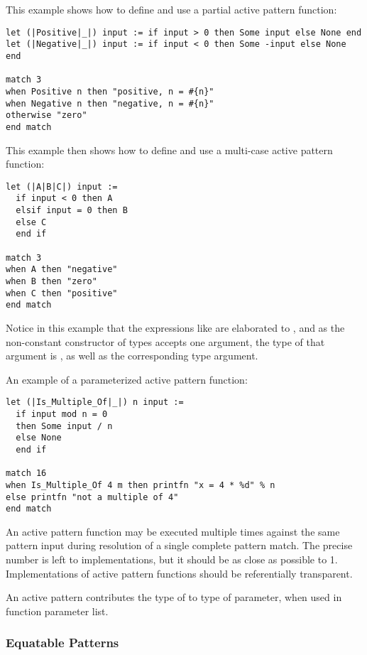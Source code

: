 \example This example shows how to define and use a partial active pattern function:
\begin{lstlisting}
let (|Positive|_|) input := if input > 0 then Some input else None end
let (|Negative|_|) input := if input < 0 then Some -input else None end

match 3
when Positive n then "positive, n = #{n}"
when Negative n then "negative, n = #{n}"
otherwise "zero"
end match
\end{lstlisting}

\example This example then shows how to define and use a multi-case active pattern function:
\begin{lstlisting}
let (|A|B|C|) input := 
  if input < 0 then A
  elsif input = 0 then B
  else C
  end if
  
match 3
when A then "negative"
when B then "zero"
when C then "positive"
end match
\end{lstlisting}
Notice in this example that the expressions like  are elaborated to , and as the non-constant constructor of  types accepts one argument, the type of that argument is , as well as the corresponding type argument. 

\example An example of a parameterized active pattern function:
\begin{lstlisting}[deletekeywords={not,of}]
let (|Is_Multiple_Of|_|) n input := 
  if input mod n = 0
  then Some input / n
  else None
  end if
  
match 16
when Is_Multiple_Of 4 m then printfn "x = 4 * %d" % n
else printfn "not a multiple of 4"
end match
\end{lstlisting}

An active pattern function may be executed multiple times against the same pattern input during resolution of a single complete pattern match. The precise number is left to implementations, but it should be as close as possible to 1. Implementations of active pattern functions should be referentially transparent. 

An active pattern contributes the type of  to type of parameter, when used in function parameter list. 





\subsubsection{Equatable Patterns}
\label{sec:equatable-patterns}

